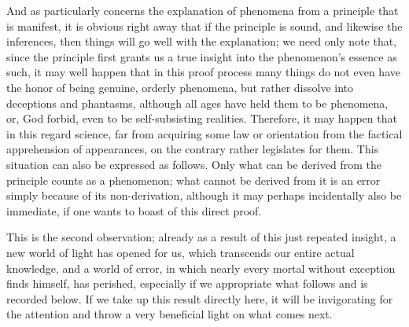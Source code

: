 And as particularly concerns the explanation
of phenomena from a principle that is manifest,
it is obvious right away that if the principle is sound,
and likewise the inferences,
then things will go well with the explanation;
we need only note that,
since the principle first grants us a true insight
into the phenomenon's essence as such,
it may well happen that in this proof process
many things do not even have the honor
of being genuine, orderly phenomena,
but rather dissolve into deceptions and phantasms,
although all ages have held them to be phenomena,
or, God forbid, even to be self-subsisting realities.
Therefore, it may happen that in this regard science,
far from acquiring some law or orientation
from the factical apprehension of appearances,
on the contrary rather legislates for them.
This situation can also be expressed as follows.
Only what can be derived from the principle
counts as a phenomenon;
what cannot be derived from it is an error
simply because of its non-derivation,
although it may perhaps incidentally also be immediate,
if one wants to boast of this direct proof.

This is the second observation;
already as a result of this just repeated insight,
a new world of light has opened for us,
which transcends our entire actual knowledge,
and a world of error,
in which nearly every mortal
without exception finds himself,
has perished,
especially if we appropriate
what follows and is recorded below.
If we take up this result directly here,
it will be invigorating for the attention
and throw a very beneficial light
on what comes next.

